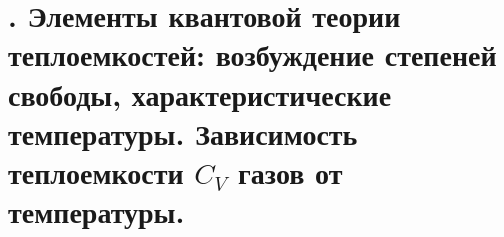 \section{\normalsize . Элементы квантовой теории теплоемкостей: возбуждение степеней свободы, характеристические температуры. Зависимость теплоемкости $C_V$ газов от температуры.}